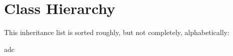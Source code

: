 \section{Class Hierarchy}
This inheritance list is sorted roughly, but not completely, alphabetically\+:\begin{DoxyCompactList}
\item adc\begin{DoxyCompactList}
\item {}
\begin{DoxyCompactList}
\item {}
\end{DoxyCompactList}
\end{DoxyCompactList}
\item {}
\begin{DoxyCompactList}
\item {}
\end{DoxyCompactList}
\item {}
\begin{DoxyCompactList}
\item {}
\end{DoxyCompactList}
\item {}
\begin{DoxyCompactList}
\item {}
\begin{DoxyCompactList}
\item {}
\end{DoxyCompactList}
\end{DoxyCompactList}
\end{DoxyCompactList}
